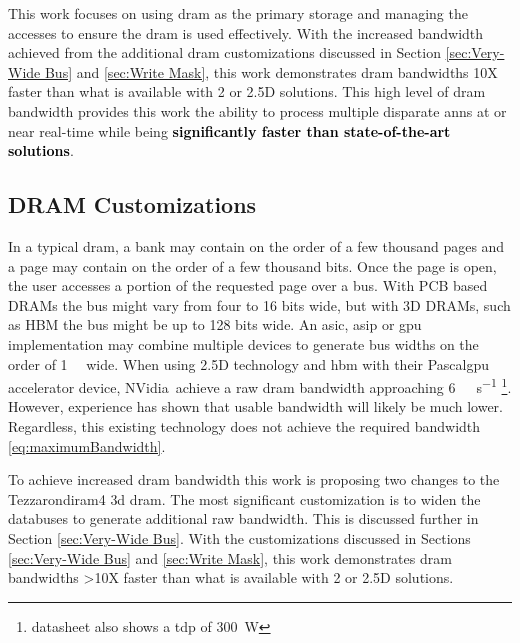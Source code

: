 This work focuses on using \ac{dram} as the primary storage and managing the accesses to ensure the \ac{dram} is used effectively. 
With the increased bandwidth achieved from the additional \ac{dram} customizations discussed in Section \ref{sec:Very-Wide Bus} and \ref{sec:Write Mask}, this work demonstrates \ac{dram} bandwidths 10X faster than what is available with 2 or 2.5D solutions.
This high level of \ac{dram} bandwidth provides this work the ability to process multiple disparate \acp{ann} at or near real-time while being \textbf{\textcolor{black}{significantly faster than state-of-the-art solutions}}.


\subsection{DRAM Customizations}

In a typical \ac{dram}, a bank may contain on the order of a few thousand pages and a page may contain on the order of a few thousand bits.
Once the page is open, the user accesses a portion of the requested page over a bus. With PCB based DRAMs the bus might vary from four to 16 bits wide, but with 3D DRAMs, such as HBM the bus might be up to 128 bits wide.
An \ac{asic}, \ac{asip} or \ac{gpu} implementation may combine multiple devices to generate bus widths on the order of \SI[per-mode=symbol]{1}{\kilo \bit} wide. 
When using 2.5D technology and \ac{hbm} with their Pascal\texttrademark \ac{gpu} accelerator device, NVidia\textregistered ~achieve a raw \ac{dram} bandwidth approaching \SI[per-mode=symbol]{6}{\tera \bit \per \second} \cite{Nvidia_p100_summary_datasheet}\footnote{datasheet also shows a \ac{tdp} of \SI[per-mode=symbol]{300}{\watt}}.
However, experience has shown \cite{farabet2011neuflow} \cite{jouppi2017datacenter} that usable bandwidth will likely be much lower.
Regardless, this existing technology does not achieve the required bandwidth \eqref{eq:maximumBandwidth}.



To achieve increased \ac{dram} bandwidth this work is proposing two changes to the Tezzaron\textregistered \ac{diram4} \cite{tezzaron:diram4} \ac{3d} \ac{dram}. 
The most significant customization is to widen the databuses to generate additional raw bandwidth. This is discussed further in Section \ref{sec:Very-Wide Bus}.
With the customizations discussed in Sections \ref{sec:Very-Wide Bus} and \ref{sec:Write Mask}, this work demonstrates \ac{dram} bandwidths >10X faster than what is available with 2 or 2.5D solutions.

